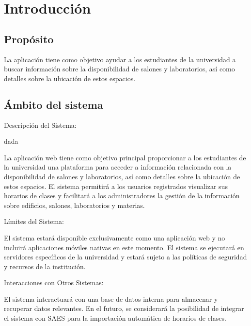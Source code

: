 
\section{Introducción}

\subsection{Propósito}
La aplicación tiene como objetivo ayudar a los estudiantes de la universidad a buscar información sobre la disponibilidad de salones y laboratorios, así como detalles sobre la ubicación de estos espacios.

\subsection{Ámbito del sistema}
Descripción del Sistema:

dada

La aplicación web tiene como objetivo principal proporcionar a los estudiantes de la universidad una plataforma para acceder a información relacionada con la disponibilidad de salones y laboratorios, así como detalles sobre la ubicación de estos espacios. El sistema permitirá a los usuarios registrados visualizar sus horarios de clases y facilitará a los administradores la gestión de la información sobre edificios, salones, laboratorios y materias.


Límites del Sistema:

El sistema estará disponible exclusivamente como una aplicación web y no incluirá aplicaciones móviles nativas en este momento.
El sistema se ejecutará en servidores específicos de la universidad y estará sujeto a las políticas de seguridad y recursos de la institución.

Interacciones con Otros Sistemas:

El sistema interactuará con una base de datos interna para almacenar y recuperar datos relevantes.
En el futuro, se considerará la posibilidad de integrar el sistema con SAES para la importación automática de horarios de clases.

